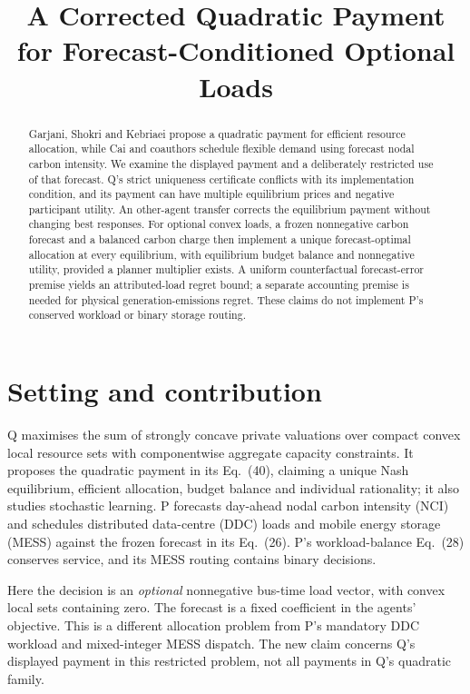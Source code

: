 \documentclass{article}
\title{A Corrected Quadratic Payment for Forecast-Conditioned Optional Loads}
\begin{document}
\maketitle

\begin{abstract}
Garjani, Shokri and Kebriaei propose a quadratic payment for efficient resource allocation, while Cai and coauthors schedule flexible demand using forecast nodal carbon intensity. We examine the displayed payment and a deliberately restricted use of that forecast. Q's strict uniqueness certificate conflicts with its implementation condition, and its payment can have multiple equilibrium prices and negative participant utility. An other-agent transfer corrects the equilibrium payment without changing best responses. For optional convex loads, a frozen nonnegative carbon forecast and a balanced carbon charge then implement a unique forecast-optimal allocation at every equilibrium, with equilibrium budget balance and nonnegative utility, provided a planner multiplier exists. A uniform counterfactual forecast-error premise yields an attributed-load regret bound; a separate accounting premise is needed for physical generation-emissions regret. These claims do not implement P's conserved workload or binary storage routing. %
\end{abstract}

\section{Setting and contribution}

Q maximises the sum of strongly concave private valuations over compact convex local resource sets with componentwise aggregate capacity constraints. It proposes the quadratic payment in its Eq.~(40), claiming a unique Nash equilibrium, efficient allocation, budget balance and individual rationality; it also studies stochastic learning. P forecasts day-ahead nodal carbon intensity (NCI) and schedules distributed data-centre (DDC) loads and mobile energy storage (MESS) against the frozen forecast in its Eq.~(26). P's workload-balance Eq.~(28) conserves service, and its MESS routing contains binary decisions. \cite{garjani2026systematic,cai2026emission} %

Here the decision is an \emph{optional} nonnegative bus-time load vector, with convex local sets containing zero. The forecast is a fixed coefficient in the agents' objective. This is a different allocation problem from P's mandatory DDC workload and mixed-integer MESS dispatch. The new claim concerns Q's displayed payment in this restricted problem, not all payments in Q's quadratic family. %
\end{document}
